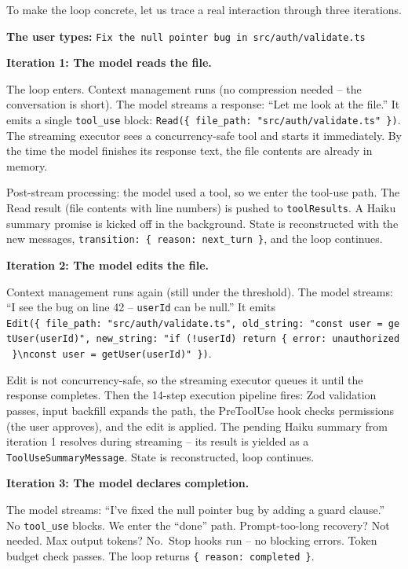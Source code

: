 \documentclass[
  english,
  11pt,
  letterpaper,
]{book}
\begin{document}
To make the loop concrete, let us trace a real interaction through three
iterations.

\textbf{The user types:}
\texttt{Fix\ the\ null\ pointer\ bug\ in\ src/auth/validate.ts}

\textbf{Iteration 1: The model reads the file.}

The loop enters. Context management runs (no compression needed -- the
conversation is short). The model streams a response: ``Let me look at
the file.'' It emits a single \texttt{tool\_use} block:
\texttt{Read(\{\ file\_path:\ "src/auth/validate.ts"\ \})}. The
streaming executor sees a concurrency-safe tool and starts it
immediately. By the time the model finishes its response text, the file
contents are already in memory.

Post-stream processing: the model used a tool, so we enter the tool-use
path. The Read result (file contents with line numbers) is pushed to
\texttt{toolResults}. A Haiku summary promise is kicked off in the
background. State is reconstructed with the new messages,
\texttt{transition:\ \{\ reason:\ \textquotesingle{}next\_turn\textquotesingle{}\ \}},
and the loop continues.

\textbf{Iteration 2: The model edits the file.}

Context management runs again (still under the threshold). The model
streams: ``I see the bug on line 42 -- \texttt{userId} can be null.'' It
emits
\texttt{Edit(\{\ file\_path:\ "src/auth/validate.ts",\ old\_string:\ "const\ user\ =\ getUser(userId)",\ new\_string:\ "if\ (!userId)\ return\ \{\ error:\ \textquotesingle{}unauthorized\textquotesingle{}\ \}\textbackslash{}nconst\ user\ =\ getUser(userId)"\ \})}.

Edit is not concurrency-safe, so the streaming executor queues it until
the response completes. Then the 14-step execution pipeline fires: Zod
validation passes, input backfill expands the path, the PreToolUse hook
checks permissions (the user approves), and the edit is applied. The
pending Haiku summary from iteration 1 resolves during streaming -- its
result is yielded as a \texttt{ToolUseSummaryMessage}. State is
reconstructed, loop continues.

\textbf{Iteration 3: The model declares completion.}

The model streams: ``I've fixed the null pointer bug by adding a guard
clause.'' No \texttt{tool\_use} blocks. We enter the ``done'' path.
Prompt-too-long recovery? Not needed. Max output tokens? No.~Stop hooks
run -- no blocking errors. Token budget check passes. The loop returns
\texttt{\{\ reason:\ \textquotesingle{}completed\textquotesingle{}\ \}}.
\end{document}
